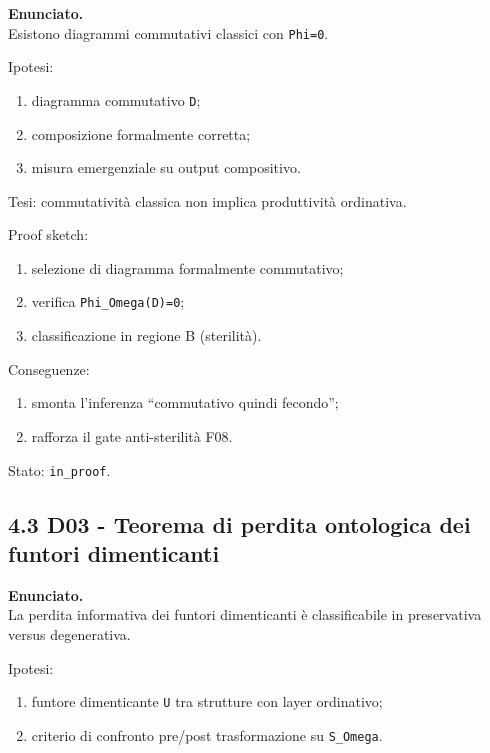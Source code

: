 \textbf{Enunciato.}\\
Esistono diagrammi commutativi classici con \texttt{Phi=0}.

Ipotesi:

\begin{enumerate}
\def\labelenumi{\arabic{enumi}.}
\tightlist
\item
  diagramma commutativo \texttt{D};
\item
  composizione formalmente corretta;
\item
  misura emergenziale su output compositivo.
\end{enumerate}

Tesi:
commutatività classica non implica produttività ordinativa.

Proof sketch:

\begin{enumerate}
\def\labelenumi{\arabic{enumi}.}
\tightlist
\item
  selezione di diagramma formalmente commutativo;
\item
  verifica \texttt{Phi\_Omega(D)=0};
\item
  classificazione in regione B (sterilità).
\end{enumerate}

Conseguenze:

\begin{enumerate}
\def\labelenumi{\arabic{enumi}.}
\tightlist
\item
  smonta l'inferenza ``commutativo quindi fecondo'';
\item
  rafforza il gate anti-sterilità F08.
\end{enumerate}

Stato: \texttt{in\_proof}.

\subsection{4.3 D03 - Teorema di perdita ontologica dei funtori dimenticanti}

\textbf{Enunciato.}\\
La perdita informativa dei funtori dimenticanti è classificabile in preservativa versus degenerativa.

Ipotesi:

\begin{enumerate}
\def\labelenumi{\arabic{enumi}.}
\tightlist
\item
  funtore dimenticante \texttt{U} tra strutture con layer ordinativo;
\item
  criterio di confronto pre/post trasformazione su \texttt{S\_Omega}.
\end{enumerate}

